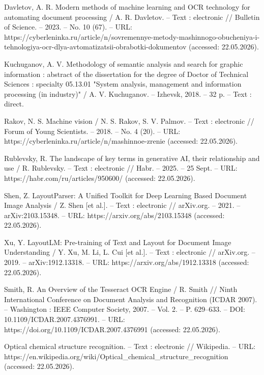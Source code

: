 Davletov, A. R. Modern methods of machine learning and OCR technology for automating document processing / A. R. Davletov. – Text : electronic // Bulletin of Science. – 2023. – No. 10 (67). – URL: https://cyberleninka.ru/article/n/sovremennye-metody-mashinnogo-obucheniya-i-tehnologiya-ocr-dlya-avtomatizatsii-obrabotki-dokumentov (accessed: 22.05.2026).

Kuchuganov, A. V. Methodology of semantic analysis and search for graphic information : abstract of the dissertation for the degree of Doctor of Technical Sciences : specialty 05.13.01 "System analysis, management and information processing (in industry)" / A. V. Kuchuganov. – Izhevsk, 2018. – 32 p. – Text : direct.

Rakov, N. S. Machine vision / N. S. Rakov, S. V. Palmov. – Text : electronic // Forum of Young Scientists. – 2018. – No. 4 (20). – URL: https://cyberleninka.ru/article/n/mashinnoe-zrenie (accessed: 22.05.2026).

Rublevsky, R. The landscape of key terms in generative AI, their relationship and use / R. Rublevsky. – Text : electronic // Habr. – 2025. – 25 Sept. – URL: https://habr.com/ru/articles/950600/ (accessed: 22.05.2026).

Shen, Z. LayoutParser: A Unified Toolkit for Deep Learning Based Document Image Analysis / Z. Shen [et al.]. – Text : electronic // arXiv.org. – 2021. – arXiv:2103.15348. – URL: https://arxiv.org/abs/2103.15348 (accessed: 22.05.2026).

Xu, Y. LayoutLM: Pre-training of Text and Layout for Document Image Understanding / Y. Xu, M. Li, L. Cui [et al.]. – Text : electronic // arXiv.org. – 2019. – arXiv:1912.13318. – URL: https://arxiv.org/abs/1912.13318 (accessed: 22.05.2026).

Smith, R. An Overview of the Tesseract OCR Engine / R. Smith // Ninth International Conference on Document Analysis and Recognition (ICDAR 2007). – Washington : IEEE Computer Society, 2007. – Vol. 2. – P. 629–633. – DOI: 10.1109/ICDAR.2007.4376991. – URL: https://doi.org/10.1109/ICDAR.2007.4376991 (accessed: 22.05.2026).

Optical chemical structure recognition. – Text : electronic // Wikipedia. – URL: https://en.wikipedia.org/wiki/Optical\_chemical\_structure\_recognition (accessed: 22.05.2026).

